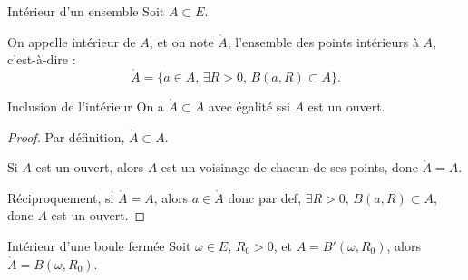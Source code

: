 \begin{definition}{Intérieur d'un ensemble}{}
    Soit $A \subset E$. 

    On appelle intérieur de $A$, et on note $\mathring{A}$, l'ensemble des points intérieurs à $A$, 
    c'est-à-dire : 
    \[\mathring A = \{a \in A, \, \exists R > 0, \, B(a, R) \subset A\}.\]
\end{definition}

\begin{proposition}{Inclusion de l'intérieur}{}
    On a $\mathring A \subset A$ avec égalité ssi $A$ est un ouvert.
\end{proposition}

\begin{proof}
    Par définition, $\mathring A \subset A$.

    Si $A$ est un ouvert, alors $A$ est un voisinage de chacun de ses points, donc $\mathring{A} = A$.

    Réciproquement, si $\mathring{A} = A$, 
    alors $a \in \mathring A$ donc par def, $\exists R > 0, \, B(a, R) \subset A$, donc $A$ est un ouvert.
\end{proof}

\begin{corollaire}{Intérieur d'une boule fermée}{}
    Soit $\omega \in E, \, R_0 > 0$, et $A = B'(\omega, R_0)$, alors $\mathring A = B(\omega, R_0)$.
\end{corollaire}


